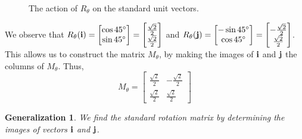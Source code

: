 \documentclass{ximera}
\renewcommand{\vec}[1]{{\bf #1}}
\newtheorem{general}{Generalization}
\begin{document}
\begin{example}
\begin{explanation}
\begin{figure}[h]

\caption{The action of $R_{\theta}$ on the standard unit vectors.}
  \label{fig:rotationex} 
\end{figure}


We observe that $R_{\theta}(\vec{i})=\begin{bmatrix}
\cos 45^{\circ} \\
\sin 45^{\circ}
\end{bmatrix}=\begin{bmatrix}
\frac{\sqrt{2}}{2} \\
\frac{\sqrt{2}}{2}
\end{bmatrix}$ and $R_{\theta}(\vec{j})=\begin{bmatrix}
-\sin 45^{\circ} \\
\cos 45^{\circ}
\end{bmatrix}=\begin{bmatrix}
-\frac{\sqrt{2}}{2} \\
\frac{\sqrt{2}}{2}
\end{bmatrix}$.  This allows us to construct the matrix $M_{\theta}$, by making the images of $\vec{i}$ and $\vec{j}$ the columns of $M_{\theta}$.  Thus, 
$$M_{\theta}=\begin{bmatrix}
\frac{\sqrt{2}}{2} & -\frac{\sqrt{2}}{2}\\
\frac{\sqrt{2}}{2} & \frac{\sqrt{2}}{2}
\end{bmatrix}$$
\end{explanation}
\end{example}

\begin{general} We find the standard rotation matrix by determining the images of vectors $\vec{i}$ and $\vec{j}$.
\end{general}
\end{document}
